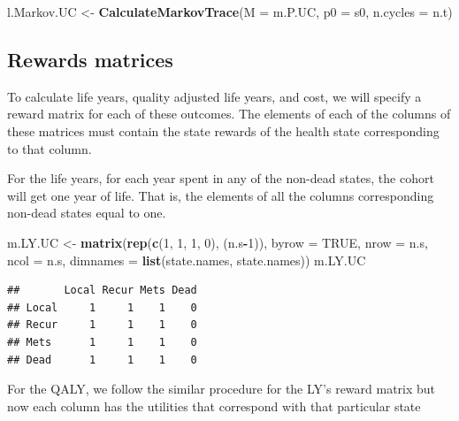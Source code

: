 \documentclass[]{article}
\newenvironment{Shaded}{\begin{snugshade}}{\end{snugshade}}
\newcommand{\KeywordTok}[1]{\textcolor[rgb]{0.13,0.29,0.53}{\textbf{#1}}}
\newcommand{\DataTypeTok}[1]{\textcolor[rgb]{0.13,0.29,0.53}{#1}}
\newcommand{\DecValTok}[1]{\textcolor[rgb]{0.00,0.00,0.81}{#1}}
\newcommand{\StringTok}[1]{\textcolor[rgb]{0.31,0.60,0.02}{#1}}
\newcommand{\OtherTok}[1]{\textcolor[rgb]{0.56,0.35,0.01}{#1}}
\newcommand{\OperatorTok}[1]{\textcolor[rgb]{0.81,0.36,0.00}{\textbf{#1}}}
\newcommand{\NormalTok}[1]{#1}
\theoremstyle{definition}
\theoremstyle{definition}
\theoremstyle{definition}
\theoremstyle{remark}
\begin{document}
\begin{Shaded}
\begin{Highlighting}[]
\NormalTok{l.Markov.UC <-}\StringTok{ }\KeywordTok{CalculateMarkovTrace}\NormalTok{(}\DataTypeTok{M =}\NormalTok{ m.P.UC, }\DataTypeTok{p0 =}\NormalTok{ s0, }\DataTypeTok{n.cycles =}\NormalTok{ n.t)}
\end{Highlighting}
\end{Shaded}

\subsection{Rewards matrices}\label{rewards-matrices}

To calculate life years, quality adjusted life years, and cost, we will
specify a reward matrix for each of these outcomes. The elements of each
of the columns of these matrices must contain the state rewards of the
health state corresponding to that column.

For the life years, for each year spent in any of the non-dead states,
the cohort will get one year of life. That is, the elements of all the
columns corresponding non-dead states equal to one.

\begin{Shaded}
\begin{Highlighting}[]
\NormalTok{m.LY.UC <-}\StringTok{ }\KeywordTok{matrix}\NormalTok{(}\KeywordTok{rep}\NormalTok{(}\KeywordTok{c}\NormalTok{(}\DecValTok{1}\NormalTok{, }\DecValTok{1}\NormalTok{, }\DecValTok{1}\NormalTok{, }\DecValTok{0}\NormalTok{), (n.s}\OperatorTok{-}\DecValTok{1}\NormalTok{)), }
                  \DataTypeTok{byrow =} \OtherTok{TRUE}\NormalTok{,}
                  \DataTypeTok{nrow =}\NormalTok{ n.s, }\DataTypeTok{ncol =}\NormalTok{ n.s, }
                  \DataTypeTok{dimnames =} \KeywordTok{list}\NormalTok{(state.names, state.names))}
\NormalTok{m.LY.UC}
\end{Highlighting}
\end{Shaded}

\begin{verbatim}
##       Local Recur Mets Dead
## Local     1     1    1    0
## Recur     1     1    1    0
## Mets      1     1    1    0
## Dead      1     1    1    0
\end{verbatim}

For the QALY, we follow the similar procedure for the LY's reward matrix
but now each column has the utilities that correspond with that
particular state
\end{document}
